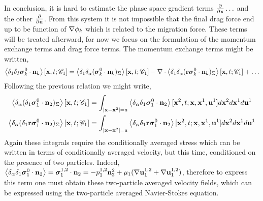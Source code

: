 In conclusion, it is hard to estimate the phase space gradient terms $\frac{\partial}{\partial \textbf{x}}\ldots$ and the other $\frac{\partial}{\partial \textbf{u}}$. 
From this system it is not impossible that the final drag force end up to be function of $\mathbf{\nabla}\phi_k$ which is related to the migration force. 
These terms will be treated afterward, for now we focus on the formulation of the momentum exchange terms and drag force terms. 
The momentum exchange terms might be written, 
\begin{equation*}
    \left<\delta_1 \delta_I
         \bm\sigma_k^0
    \cdot \textbf{n}_k  \right>[\textbf{x},t;\mathscr{C}_1]
    = 
    \left<\delta_1 
    \delta_\alpha
    ( \bm\sigma_k^0
   \cdot \textbf{n}_k  )_{\Sigma}\right>[\textbf{x},t;\mathscr{C}_1]
    - \mathbf{\nabla}\cdot \left<\delta_1 
    \delta_\alpha
    ( \textbf{r}\bm\sigma_k^0
   \cdot \textbf{n}_k  )_{\Sigma}\right>[\textbf{x},t;\mathscr{C}_1]
   + \ldots
\end{equation*}
Following the previous relation we might write, 
\begin{align}
    \left<\delta_\alpha ( \delta_1\bm\sigma_1^0\cdot\textbf{n}_2 )_{\Sigma}\right>[\textbf{x},t;\mathscr{C}_1]
    &=
    \int_{|\textbf{x}-\textbf{x}^2|=a}
    \left<\delta_\alpha \delta_1  \bm\sigma_1^0\cdot \textbf{n}_2\right>
    [\textbf{x}^2,t;\textbf{x},\textbf{x}^1,\textbf{u}^1]
    d\textbf{x}^2
    d\textbf{x}^1
    d\textbf{u}^1\\
    \left<\delta_\alpha ( \delta_1\textbf{r}\bm\sigma_1^0\cdot\textbf{n}_2 )_{\Sigma}\right>[\textbf{x},t;\mathscr{C}_1]
    &=
    \int_{|\textbf{x}-\textbf{x}^2|=a}
    \left<\delta_\alpha \delta_1  \textbf{r}\bm\sigma_1^0\cdot \textbf{n}_2\right>
    [\textbf{x}^2,t;\textbf{x},\textbf{x}^1,\textbf{u}^1]
    d\textbf{x}^2
    d\textbf{x}^1
    d\textbf{u}^1
\end{align}
Again these integrals require the conditionally averaged stress which can be written in terms of conditionally averaged velocity, but this time, conditioned on the presence of two particles.
Indeed, $\left<\delta_\alpha \delta_1  \bm\sigma_1^0\cdot \textbf{n}_2\right> =\bm\sigma_1^{1,2}\cdot \textbf{n}_2 =- p^{1,2}_1 \textbf{n}_2^{2} + \mu_1 (\mathbf{\nabla} \textbf{u}_1^{1,2}+\mathbf{\nabla} \textbf{u}_1^{1,2})$, therefore to express this term one must obtain these two-particle averaged velocity fields, which can be expressed using the two-particle averaged Navier-Stokes equation. 

